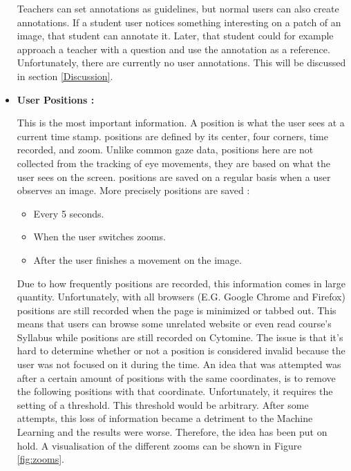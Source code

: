 \documentclass[a4paper,11pt]{report}
\numberwithin{figure}{section} %
\begin{document}
\begin{itemize}
        Teachers can set annotations as guidelines, but normal users can also create annotations.
        If a student user notices something interesting on a patch of an image, that student can annotate it.
        Later, that student could for example approach a teacher with a question and use the annotation as a reference.
        Unfortunately, there are currently no user annotations.
        This will be discussed in section \ref{Discussion}.\\

        \item[\textbullet]  \textbf{User Positions :}\newline

         This is the most important information.
         A position is what the user sees at a current time stamp.
         positions are defined by its center, four corners, time recorded, and zoom.
         Unlike common gaze data, positions here are not collected from the tracking of eye movements, they are based on what the user sees on the screen.
         positions are saved on a regular basis when a user observes an image.
         More precisely positions are saved :
         \begin{itemize}
         	\item[\textbullet] Every 5 seconds.
            \item[\textbullet] When the user switches zooms.
            \item[\textbullet] After the user finishes a movement on the image.
         \end{itemize}
         Due to how frequently positions are recorded, this information comes in large quantity.
         Unfortunately, with all browsers (E.G. Google Chrome and Firefox) positions are still recorded when the page is minimized or tabbed out.
         This means that users can browse some unrelated website or even read course's Syllabus while positions are still recorded on Cytomine.
         The issue is that it's hard to determine whether or not a position is considered invalid because the user was not focused on it during the time.
         An idea that was attempted was after a certain amount of positions with the same coordinates, is to remove the following positions with that coordinate.
         Unfortunately, it requires the setting of a threshold.
         This threshold would be arbitrary.
         After some attempts, this loss of information became a detriment to the Machine Learning and the results were worse.
         Therefore, the idea has been put on hold.
         A visualisation of the different zooms can be shown in Figure \ref{fig:zooms}.\\



\end{itemize}
\end{document}
